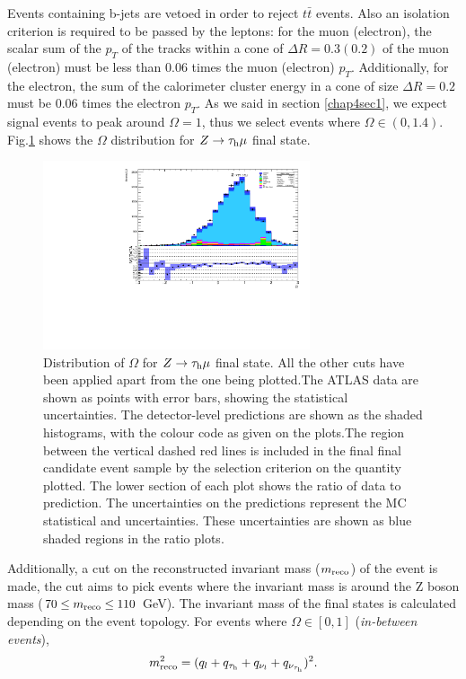 Events containing b-jets are vetoed in order to reject $t\bar{t}$ events. Also an isolation criterion is required to be passed by the leptons: for the muon (electron), the scalar sum of the $p_T$ of the tracks within a cone of $\Delta R=0.3 (0.2)$ of the muon (electron) must be less than 0.06 times the muon (electron) $p_T$. Additionally, for the electron, the sum of the calorimeter cluster energy in a cone of size $\Delta R=0.2$ must be 0.06 times the electron $p_T$. As we said in section \ref{chap4sec1}, we expect signal events to peak around $\Omega=1$, thus we select events where $\Omega\in (0,1.4)$. Fig.\ref{Fig9} shows the $\Omega$ distribution for $Z\to\tau_\text{h}\mu$ final state.
\begin{figure}[h]
	\centering
	\includegraphics[width=0.7\textwidth]{figures/Fig9}
	\caption{Distribution of $\Omega$ for $Z\to\tau_\text{h}\mu$ final state. All the other cuts have been applied apart from the one being plotted.The ATLAS data are shown as points with error bars, showing the statistical uncertainties. The detector-level predictions are shown as the shaded histograms, with the colour code as given on the plots.The region between the vertical dashed red lines is included in the final final candidate event sample by the selection criterion on the quantity plotted. The lower section of each plot shows the ratio of data to prediction. The uncertainties on the predictions represent the MC statistical and uncertainties. These uncertainties are shown as blue shaded regions in the ratio plots.}
	\label{Fig9}
\end{figure}
Additionally, a cut on the reconstructed invariant mass ($m_{\text{reco}}$) of the event is made, the cut aims to pick events where the invariant mass is around the Z boson mass ($70\leq m_{\text{reco}}\leq 110$ GeV). The invariant mass of the final states is calculated depending on the event topology. For events where $\Omega\in [0,1]$ (\textit{in-between events}),
\begin{equation}
	m_{\text{reco}}^{2}=(q_l+q_{\tau_\text{h}}+q_{\nu_l}+q_{\nu_{\tau_\text{h}}})^2.
	\label{eq35}
\end{equation}
